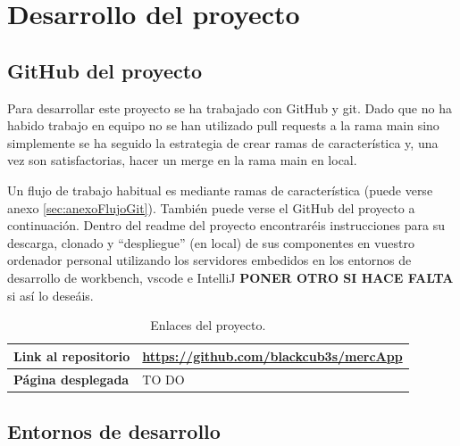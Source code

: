 \documentclass[a4paper,12pt]{report}
\begin{document}
	\chapter{Desarrollo del proyecto} %
	

	
	
				
			\section{GitHub del proyecto}
			
				Para desarrollar este proyecto se ha trabajado con GitHub y git. Dado que no ha habido trabajo en equipo no se han utilizado pull requests a la rama main sino simplemente se ha seguido la estrategia de crear ramas de característica y, una vez son satisfactorias, hacer un merge en la rama main en local.
				
				Un flujo de trabajo habitual es mediante ramas de característica (puede verse anexo \ref{sec:anexoFlujoGit}). También puede verse el GitHub del proyecto a continuación. Dentro del readme del proyecto encontraréis instrucciones para su descarga, clonado y ``despliegue'' (en local) de sus componentes en vuestro ordenador personal utilizando los servidores embedidos en los entornos de desarrollo de workbench, vscode e IntelliJ \textbf{PONER OTRO SI HACE FALTA} si así lo deseáis.
			

			
			
			
			
			
			
			
			
			
			
			
			
			\begin{table}[h!]
				\centering
				\begin{tabular}{|p{3.8cm}|p{11cm}|}
					\hline
					\textbf{Link al repositorio} & \href{https://github.com/blackcub3s/mercApp}{https://github.com/blackcub3s/mercApp} \\
					\hline
					\textbf{Página desplegada} & TO DO \\ %
					\hline
				\end{tabular}
				\caption{Enlaces  del proyecto.}
				\label{tabla:enlaces}
			\end{table}

	
	
		
			\section{Entornos de desarrollo}
			
\end{document}
